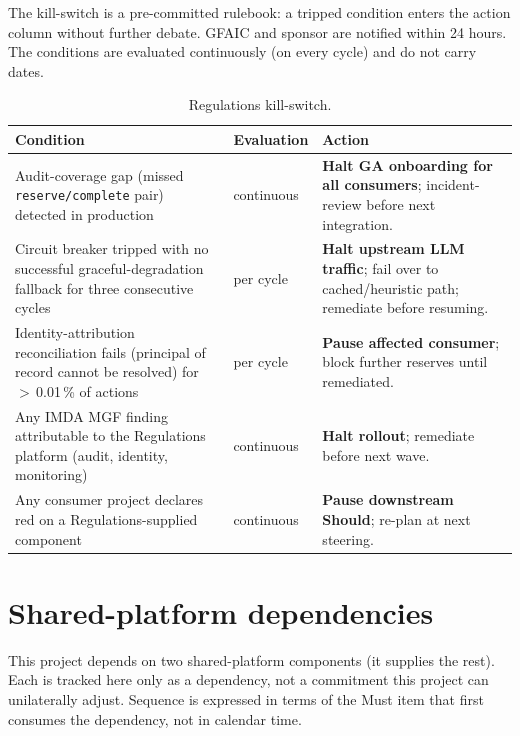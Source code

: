 The kill-switch is a pre-committed rulebook: a tripped condition enters
the action column without further debate. GFAIC and sponsor are
notified within 24 hours. The conditions are evaluated continuously
(on every cycle) and do not carry dates.

\begin{table}[htbp]
\centering
\caption{Regulations kill-switch.}
\label{tab:reg-kill-switch}
\footnotesize
\begin{tabularx}{\linewidth}{@{}l l X@{}}
\toprule
\textbf{Condition} & \textbf{Evaluation} & \textbf{Action} \\ \midrule
Audit-coverage gap (missed \texttt{reserve/complete} pair) detected in production & continuous & \textbf{Halt GA onboarding for all consumers}; incident-review before next integration. \\
Circuit breaker tripped with no successful graceful-degradation fallback for three consecutive cycles & per cycle & \textbf{Halt upstream LLM traffic}; fail over to cached/heuristic path; remediate before resuming. \\
Identity-attribution reconciliation fails (principal of record cannot be resolved) for $>$\,0.01\,\% of actions & per cycle & \textbf{Pause affected consumer}; block further reserves until remediated. \\
Any IMDA MGF finding attributable to the Regulations platform (audit, identity, monitoring) & continuous & \textbf{Halt rollout}; remediate before next wave. \\
Any consumer project declares red on a Regulations-supplied component & continuous & \textbf{Pause downstream Should}; re-plan at next steering. \\
\bottomrule
\end{tabularx}
\end{table}

\section{Shared-platform dependencies}\label{sec:reg-shared-deps}

This project depends on two shared-platform components (it supplies
the rest). Each is tracked here only as a dependency, not a commitment
this project can unilaterally adjust. Sequence is expressed in terms
of the Must item that first consumes the dependency, not in calendar
time.

